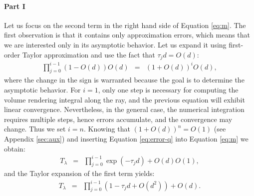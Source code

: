 \paragraph*{Part I}
Let us focus on the second term in the right hand side of Equation \eqref{eq:m}. The first observation is that it contains only approximation errors, which means that we are  interested only in its asymptotic behavior. Let us expand it using first-order Taylor approximation and use the fact that  $\tau_j d = O(d)$: 
\begin{eqnarray}
\prod_{j=0}^{i-1}\left(1-O(d)\right)O(d) &=& \left(1+O(d)\right)^iO(d), \label{eq:error-q}
\end{eqnarray}
%
where the change in the sign is warranted because the goal is to determine the asymptotic behavior. For $i = 1$, only one step is necessary for computing the volume rendering integral along the ray, and the previous equation will exhibit linear convergence.  Nevertheless, in the general case, the numerical integration requires multiple steps, hence errors accumulate, and the convergence may change. Thus  we set $i = n$. Knowing that $(1 + O(d) )^{n} = O(1)$ (see Appendix \ref{sec:aux}) and inserting Equation \eqref{eq:error-q} into Equation \eqref{eq:m} we obtain:
\begin{eqnarray}
T_\lambda
& = & \prod_{j=0}^{i-1}\exp(-\tau_j d)  + O(d)O(1),
\end{eqnarray}
and the Taylor expansion of the first term yields:
\begin{eqnarray}
T_\lambda
& = & \prod_{j=0}^{i-1} \left(1 - \tau_jd + O(d^2)\right) + O(d).\label{eq:partial}
\end{eqnarray}

